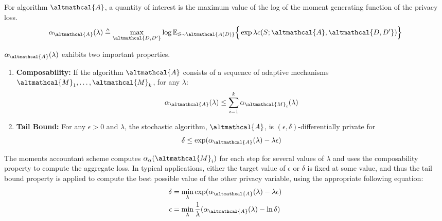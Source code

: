 \begin{definition}
	For algorithm $\altmathcal{A}$, a quantity of interest is the maximum value of the log of the moment generating function of the privacy loss. 
	\begin{align}
	\alpha_\altmathcal{A}(\lambda) \triangleq \max_{\altmathcal{D, D'}} \log \mathbb{E}_{S \sim \altmathcal{A(D)}} \Big \lbrace \exp \lambda c(S; \altmathcal{A}, \altmathcal{D, D'}) \Big \rbrace
	\end{align}
\end{definition}
\cite{moments_account}
\begin{theorem}
	$\alpha_\altmathcal{A}(\lambda)$ exhibits two important properties. \begin{enumerate}
		\item \textbf{Composability:} If the algorithm $\altmathcal{A}$ consists of a sequence of adaptive mechanisms $\altmathcal{M}_1, \ldots, \altmathcal{M}_k$, for any $\lambda$:
		\begin{equation}
		\alpha_\altmathcal{A}(\lambda) \leq \sum_{i=1}^k \alpha_{\altmathcal{M}_i}(\lambda)
		\end{equation}
		
		\item \textbf{Tail Bound:} For any $\epsilon > 0$ and $\lambda$, the stochastic algorithm, $\altmathcal{A}$, is $(\epsilon, \delta)$-differentially private for
		\begin{equation}
		\delta \leq \exp(\alpha_{\altmathcal{A}}(\lambda) - \lambda \epsilon)
		\end{equation}
	\end{enumerate}
\end{theorem}
The moments accountant scheme computes $\alpha_\alpha(\altmathcal{M}_i)$ for each step for several values of $\lambda$ and uses the composability property to compute the aggregate loss. \cite{moments_account} In typical applications, either the target value of $\epsilon$ or $\delta$ is fixed at some value, and thus the tail bound property is applied to compute the best possible value of the other privacy variable, using the appropriate following equation:
\begin{align}
\delta &= \min_\lambda \exp(\alpha_{\altmathcal{A}}(\lambda) - \lambda \epsilon) \\
\epsilon &= \min_\lambda \frac{1}{\lambda} (\alpha_{\altmathcal{A}}(\lambda) - \ln \delta)
\end{align}

